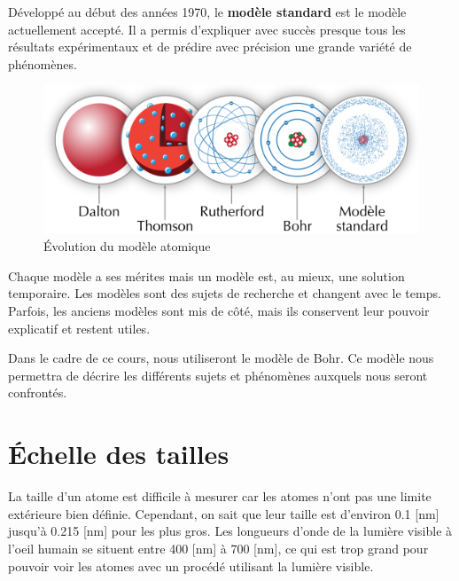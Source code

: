 \documentclass[
  11pt,
  a4paper,
  openany]{book}
\begin{document}
Développé au début des années 1970, le \textbf{modèle standard} est le modèle actuellement accepté. Il a permis d'expliquer avec succès presque tous les résultats expérimentaux et de prédire avec précision une grande variété de phénomènes.

\begin{figure}

{\centering \includegraphics[width=0.85\linewidth]{images/modeles-atomiques-evol-3} 

}

\caption{Évolution du modèle atomique}\label{fig:modeles-atomiques-evol-3}
\end{figure}

Chaque modèle a ses mérites mais un modèle est, au mieux, une solution temporaire. Les modèles sont des sujets de recherche et changent avec le temps. Parfois, les anciens modèles sont mis de côté, mais ils conservent leur pouvoir explicatif et restent utiles.

Dans le cadre de ce cours, nous utiliseront le modèle de Bohr. Ce modèle nous permettra de décrire les différents sujets et phénomènes auxquels nous seront confrontés.

\newpage

\hypertarget{uxe9chelle-des-tailles}{%
\section{Échelle des tailles}\label{uxe9chelle-des-tailles}}

La taille d'un atome est difficile à mesurer car les atomes n'ont pas une limite extérieure bien définie. Cependant, on sait que leur taille est d'environ 0.1 {[}nm{]} jusqu'à 0.215 {[}nm{]} pour les plus gros. Les longueurs d'onde de la lumière visible à l'oeil humain se situent entre 400 {[}nm{]} à 700 {[}nm{]}, ce qui est trop grand pour pouvoir voir les atomes avec un procédé utilisant la lumière visible.
\end{document}
